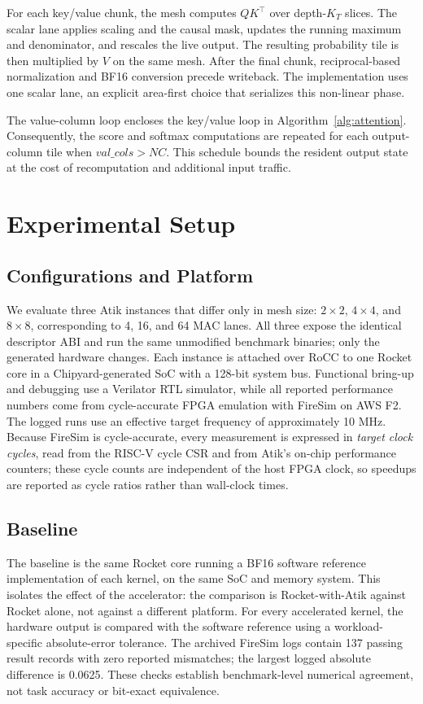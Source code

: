 \documentclass[sigconf,nonacm]{acmart}
\begin{document}
For each key/value chunk, the mesh computes $QK^\top$ over depth-$K_T$ slices.
The scalar lane applies scaling and the causal mask, updates the running maximum
and denominator, and rescales the live output. The resulting probability tile is
then multiplied by $V$ on the same mesh. After the final chunk, reciprocal-based
normalization and BF16 conversion precede writeback. The implementation uses one
scalar lane, an explicit area-first choice that serializes this non-linear phase.

The value-column loop encloses the key/value loop in
Algorithm~\ref{alg:attention}. Consequently, the score and softmax computations
are repeated for each output-column tile when $\mathit{val\_cols}>NC$.
This schedule bounds the resident output state at the cost of recomputation
and additional input traffic.

\section{Experimental Setup}
\label{sec:setup}

\subsection{Configurations and Platform}
We evaluate three Atik instances that differ only in mesh size: $2\times2$,
$4\times4$, and $8\times8$, corresponding to 4, 16, and 64 MAC lanes. All three
expose the identical descriptor ABI and run the same unmodified benchmark
binaries; only the generated hardware changes. Each instance is attached over
RoCC to one Rocket core in a Chipyard-generated SoC with a 128-bit system bus. Functional
bring-up and debugging use a Verilator RTL simulator, while all reported
performance numbers come from cycle-accurate FPGA emulation with FireSim on AWS
F2. The logged runs use an effective target frequency of approximately 10 MHz.
Because FireSim is
cycle-accurate, every measurement is expressed in \emph{target clock cycles},
read from the RISC-V cycle CSR and from Atik's on-chip performance counters;
these cycle counts are independent of the host FPGA clock, so speedups are
reported as cycle ratios rather than wall-clock times.

\subsection{Baseline}
The baseline is the same Rocket core running a BF16 software reference
implementation of each kernel, on the same SoC and memory system. This isolates
the effect of the accelerator: the comparison is Rocket-with-Atik against
Rocket alone, not against a different platform. For every accelerated kernel,
the hardware output is compared with the software reference using a
workload-specific absolute-error tolerance. The archived FireSim logs contain
137 passing result records with zero reported mismatches; the largest logged
absolute difference is 0.0625. These checks establish benchmark-level numerical
agreement, not task accuracy or bit-exact equivalence.
\end{document}
